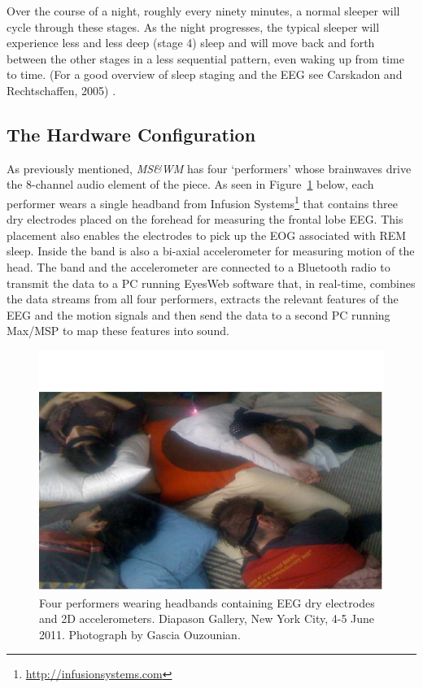 Over the course of a night, roughly every ninety minutes, a normal sleeper will
cycle through these stages.  As the night progresses, the typical sleeper will
experience less and less deep (stage 4) sleep and will move back and forth
between the other stages in a less sequential pattern, even waking up from time
to time. (For a good overview of sleep staging and the EEG see Carskadon and
Rechtschaffen, 2005) \cite{Carskadon:2005}.

\subsection{The Hardware Configuration}

As previously mentioned, \textit{MS\&WM} has four `performers' whose brainwaves drive the 8-channel audio element of the piece. As seen in Figure~\ref{Ouzounian:fig:1} below, each performer wears a single headband from Infusion Systems\footnote{\url{http://infusionsystems.com}} that contains three dry electrodes placed on the forehead for measuring the frontal lobe EEG. This placement also enables the electrodes to pick up the EOG associated with REM sleep.  Inside the band is also a bi-axial accelerometer for measuring motion of the head.  The band and the accelerometer are connected to a Bluetooth radio to transmit the data to a PC running EyesWeb software that, in real-time, combines the data streams from all four performers, extracts the relevant features of the EEG and the motion signals and then send the data to a second PC running Max/MSP to map these features into sound.



\begin{figure}[t]
\centering
\includegraphics[width=\textwidth]{img-2-eps-converted-to-crop.pdf}
\caption{Four performers wearing headbands containing EEG dry electrodes and 2D accelerometers.  Diapason Gallery, New York City, 4-5 June 2011. Photograph by Gascia Ouzounian.}
\label{Ouzounian:fig:1}
\end{figure}

